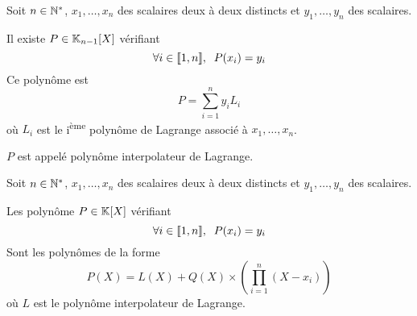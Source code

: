 \begin{prp}
Soit $n \in \mathbb{N}^*$, $x_1, \ldots, x_n$ des scalaires deux à deux distincts
et $y_1, \ldots, y_n$ des scalaires.

Il existe $P \in \mathbb{K}_{n - 1}[X]$ vérifiant 
\[
    \forall i \in \llbracket 1, n \rrbracket, \;\; P(x_i) = y_i
\]
Ce polynôme est
\[
    P = \sum^n_{i = 1} y_i L_i
\]
où $L_i$ est le i\textsuperscript{ème} polynôme de Lagrange associé à
$x_1, \ldots, x_n$.

$P$ est appelé polynôme interpolateur de Lagrange.
\end{prp}

\begin{prp}
Soit $n \in \mathbb{N}^*$, $x_1, \ldots, x_n$ des scalaires deux à deux distincts
et $y_1, \ldots, y_n$ des scalaires.

Les polynôme $P \in \mathbb{K}[X]$ vérifiant
\[
    \forall i \in \llbracket 1, n \rrbracket, \;\; P(x_i) = y_i
\]
Sont les polynômes de la forme
\[
    P(X) = L(X) + Q(X) \times \left( \prod^n_{i = 1} (X - x_i)
    \right)
\]
où $L$ est le polynôme interpolateur de Lagrange.
\end{prp}




